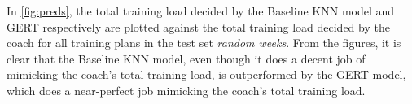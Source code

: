 
In \cref{fig:preds}, the total training load decided by the Baseline KNN model and GERT respectively are plotted against the total training load decided by the coach for all training plans in the test set \textit{random weeks}.
From the figures, it is clear that the Baseline KNN model, even though it does a decent job of mimicking the coach's total training load, is outperformed by the GERT model, which does a near-perfect job mimicking the coach's total training load.

